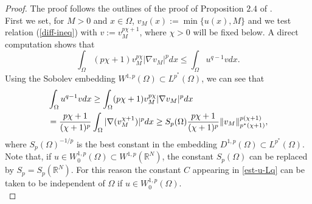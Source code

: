 \documentclass[11pt,reqno]{amsart}
\theoremstyle{definition}
\numberwithin{equation}{section}
\numberwithin{theorem}{section}
\numberwithin{equation}{section}
\numberwithin{theorem}{section}
\newcommand{\R}{\mathbb{R}}
\begin{document}
\begin{proof}
The proof follows the outlines of the proof of Proposition $2.4$ of \cite{PR}.\\

First we set, for $M>0$ and $x\in\Omega$, $v_M(x):=\min\{u(x),M\}$ and we test relation (\ref{diff-ineq}) with $v:=v_M^{p\chi+1}$, where $\chi>0$ will be fixed below. A direct computation shows that
$$\int_\Omega (p\chi+1)v_M^{p\chi}|\nabla v_M|^p dx%
\le\int_\Omega u^{q-1}v dx.$$ 
Using the Sobolev embedding $W^{1,p}(\Omega)\subset L^{p^*}(\Omega)$, we can see that
\begin{equation}\notag
\begin{aligned}
&\int_\Omega u^{q-1}v dx\ge \int_\Omega (p\chi+1)v_M^{p\chi}|\nabla v_M|^p dx\\
&=\frac{p\chi+1}{(\chi+1)^p}\int_\Omega |\nabla (v_M^{\chi+1})|^p dx\ge S_p(\Omega)\frac{p\chi+1}{(\chi+1)^p}\|v_M\|^{p(\chi+1)}_{p^*(\chi+1)},
\end{aligned}
\end{equation}
where $S_p(\Omega)^{-1/p}$ is the best constant in the embedding $D^{1,p}(\Omega)\subset L^{p^*}(\Omega)$.\\ 

Note that, if $u\in W^{1,p}_0(\Omega)\subset W^{1,p}(\R^N)$, the constant $S_p(\Omega)$ can be replaced by $S_p=S_p(\R^N)$. For this reason the constant $C$ appearing in \ref{est-u-Lq} can be taken to be independent of $\Omega$ if $u\in W^{1,p}_0(\Omega)$.\\


\end{proof}
\end{document}
